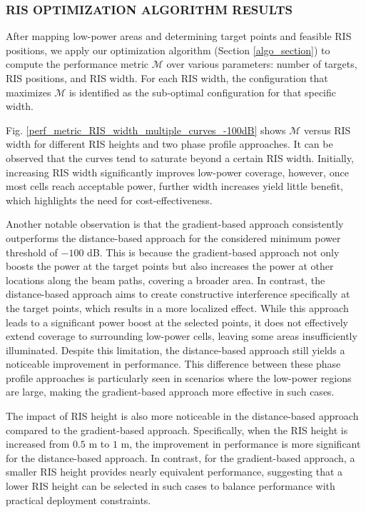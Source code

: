\documentclass{IEEEoj}
\begin{document}
\subsubsection{RIS OPTIMIZATION ALGORITHM RESULTS}
After mapping low-power areas and determining target points and feasible RIS positions, we apply our optimization algorithm (Section \ref{algo_section}) to compute the performance metric $\mathcal{M}$ over various parameters: number of targets, RIS positions, and RIS width. For each RIS width, the configuration that maximizes $\mathcal{M}$ is identified as the sub-optimal configuration for that specific width.

Fig. \ref{perf_metric_RIS_width_multiple_curves_-100dB} shows $\mathcal{M}$ versus RIS width for different RIS heights and two phase profile approaches. It can be observed that the curves tend to saturate beyond a certain RIS width. Initially, increasing RIS width significantly improves low-power coverage, however, once most cells reach acceptable power, further width increases yield little benefit, which highlights the need for cost-effectiveness.

Another notable observation is that the gradient-based approach consistently outperforms the distance-based approach for the considered minimum power threshold of $-100$ dB. This is because the gradient-based approach not only boosts the power at the target points but also increases the power at other locations along the beam paths, covering a broader area. In contrast, the distance-based approach aims to create constructive interference specifically at the target points, which results in a more localized effect. While this approach leads to a significant power boost at the selected points, it does not effectively extend coverage to surrounding low-power cells, leaving some areas insufficiently illuminated. Despite this limitation, the distance-based approach still yields a noticeable improvement in performance. This difference between these phase profile approaches is particularly seen in scenarios where the low-power regions are large, making the gradient-based approach more effective in such cases.

The impact of RIS height is also more noticeable in the distance-based approach compared to the gradient-based approach. Specifically, when the RIS height is increased from $0.5$ m to $1$ m, the improvement in performance is more significant for the distance-based approach. In contrast, for the gradient-based approach, a smaller RIS height provides nearly equivalent performance, suggesting that a lower RIS height can be selected in such cases to balance performance with practical deployment constraints.
\end{document}
